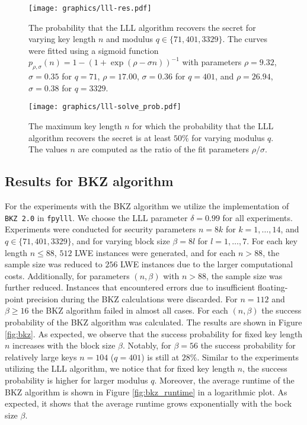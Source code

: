 \begin{figure}[htbp]
\texttt{[image: graphics/lll-res.pdf]}
\caption{The probability that the LLL algorithm recovers the secret for varying key length $n$ and modulus $q\in\{71,401,3329\}$. The curves were fitted using a sigmoid function $p_{\rho,\sigma}(n)=1-(1+\exp(\rho-\sigma n))^{-1}$ with parameters $\rho=9.32$, $\sigma=0.35$ for $q=71$, $\rho=17.00$, $\sigma=0.36$ for $q=401$, and $\rho=26.94$, $\sigma=0.38$ for $q=3329$.}
\label{fig:lll_1}
\end{figure}

\begin{figure}[htbp]
\texttt{[image: graphics/lll-solve\_prob.pdf]}
\caption{The maximum key length $n$ for which the probability that the LLL algorithm recovers the secret is at least $50\%$ for varying modulus $q$. The values $n$ are computed as the ratio of the fit parameters $\rho/\sigma$.}
\label{fig:lll_2}
\end{figure}


\subsection{Results for BKZ algorithm}
\label{sec:Experiments:BKZ}

For the experiments with the BKZ algorithm we utilize the implementation of \texttt{BKZ 2.0} in \texttt{fpylll}. We choose the LLL parameter $\delta=0.99$ for all experiments. Experiments were conducted for security parameters $n=8k$ for $k=1,\dotsc,14$, and $q\in\{71,401,3329\}$, and for varying block size $\beta=8l$ for $l=1,\dotsc,7$. For each key length $n\leq 88$, $512$ LWE instances were generated, and for each $n>88$, the sample size was reduced to $256$ LWE instances due to the larger computational costs.  
Additionally, for parameters $(n,\beta)$ with $n>88$, the sample size was further reduced. Instances that encountered errors due to insufficient floating-point precision during the BKZ calculations were discarded. For $n=112$ and $\beta\geq16$ the BKZ algorithm failed in almost all cases. For each $(n,\beta)$ the success probability of the BKZ algorithm was calculated. The results are shown in Figure \ref{fig:bkz}. As expected, we observe that the success probability for fixed key length $n$ increases with the block size $\beta$. 
Notably, for $\beta=56$ the success probability for relatively large keys $n=104$ ($q=401$) is still at $28\%$. 
Similar to the experiments utilizing the LLL algorithm, we notice that for fixed key length $n$, the success probability is higher for larger modulus $q$.
Moreover, the average runtime of the BKZ algorithm is shown in Figure \ref{fig:bkz_runtime} in a logarithmic plot. As expected, it shows that the average runtime grows exponentially with the bock size $\beta$.


